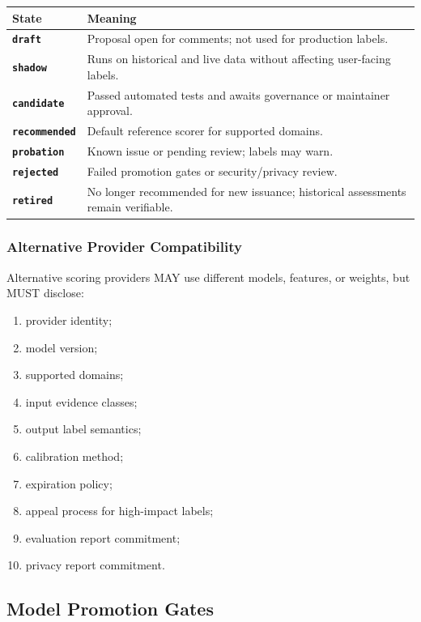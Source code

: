\documentclass[11pt]{article}
\begin{document}
\begin{center}
\begin{tabularx}{\textwidth}{>{\bfseries}p{} X}
\toprule
State & Meaning \\
\midrule
\texttt{draft} & Proposal open for comments; not used for production labels. \\
\texttt{shadow} & Runs on historical and live data without affecting user-facing labels. \\
\texttt{candidate} & Passed automated tests and awaits governance or maintainer approval. \\
\texttt{recommended} & Default reference scorer for supported domains. \\
\texttt{probation} & Known issue or pending review; labels may warn. \\
\texttt{rejected} & Failed promotion gates or security/privacy review. \\
\texttt{retired} & No longer recommended for new issuance; historical assessments remain verifiable. \\
\bottomrule
\end{tabularx}
\end{center}

\subsubsection{Alternative Provider Compatibility}

Alternative scoring providers MAY use different models, features, or weights, but MUST disclose:

\begin{enumerate}
    \item provider identity;
    \item model version;
    \item supported domains;
    \item input evidence classes;
    \item output label semantics;
    \item calibration method;
    \item expiration policy;
    \item appeal process for high-impact labels;
    \item evaluation report commitment;
    \item privacy report commitment.
\end{enumerate}

\subsection{Model Promotion Gates}
\end{document}

